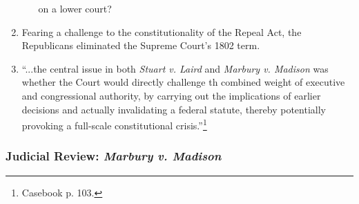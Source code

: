 \begin{enumerate}
\begin{enumerate}
        on a lower court?
    \end{enumerate}
    \item Fearing a challenge to the constitutionality of the Repeal Act, the 
    Republicans eliminated the Supreme Court's 1802 term.
    \item ``...the central issue in both \emph{Stuart v. Laird} and 
    \emph{Marbury v. Madison} was whether the Court would directly challenge 
    th combined weight of executive and congressional authority, by carrying 
    out the implications of earlier decisions and actually invalidating a 
    federal statute, thereby potentially provoking a full-scale constitutional 
    crisis.''\footnote{Casebook p. 103.}
\end{enumerate}

\subsubsection{Judicial Review: \emph{Marbury v. Madison}}


